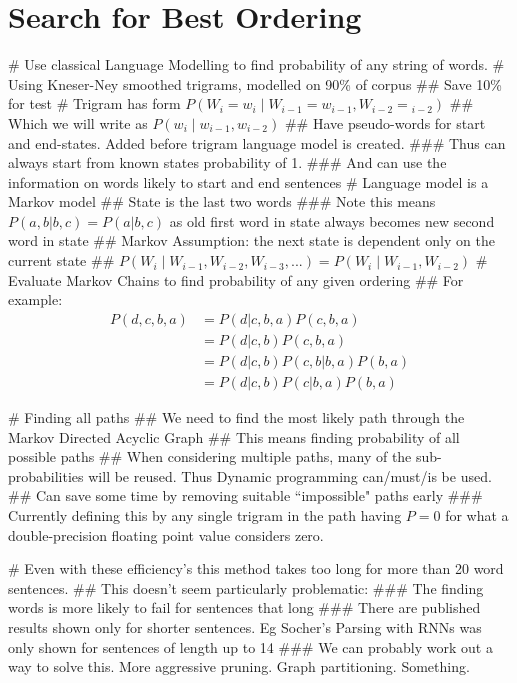 \documentclass[]{scrartcl}
\numberwithin{equation}{section}
\numberwithin{figure}{section}
\theoremstyle{plain}
\theoremstyle{definition}
\begin{document}
\section{Search for Best Ordering}
\begin{easylist}[itemize]
	# Use classical Language Modelling to find probability of any string of words.
	# Using Kneser-Ney smoothed trigrams, modelled on 90\% of corpus
	## Save 10\% for test
	# Trigram has form $P(W_i\!=\!w_i \mid W_{i-1}\!=\!w_{i-1}, W_{i-2}\!=\!_{i-2})$
	## Which we will write as $P(w_i \mid w_{i-1}, w_{i-2})$
	## Have pseudo-words for start and end-states. Added before trigram language model is created.
	### Thus can always start from known states probability of 1.
	### And can use the information on words likely to start and end sentences
	# Language model is a Markov model
	## State is the last two words
	### Note this means $P(a,b|b,c)=P(a|b,c)$ as old first word in state always becomes new second word in state
	## Markov Assumption: the next state is dependent only on the current state
	##  $P(W_i \mid W_{i-1}, W_{i-2}, W_{i-3}, ...) = P(W_i \mid W_{i-1}, W_{i-2})$
	# Evaluate Markov Chains to find probability of any given ordering
	## For example:
	\begin{equation}
	\begin{split}
	P(d,c,b,a) &= P(d|c,b,a) P(c,b,a) \\
			   &= P(d|c,b) P(c,b,a) \\
			   &= P(d|c,b) P(c,b|b,a) P(b,a) \\
			   &=P(d|c,b) P(c|b,a) P(b,a)
	\end{split}
	\end{equation}
	
	# Finding all paths
	## We need to find the most likely path through the Markov Directed Acyclic Graph
	## This means finding probability of all possible paths
	## When considering multiple paths, many of the sub-probabilities will be reused. Thus Dynamic programming can/must/is be used.
	## Can save some time by removing suitable ``impossible" paths early
	### Currently defining this by any single trigram in the path having $P=0$ for what a double-precision floating point value considers zero.
	
	# Even with these efficiency's this method takes too long for more than 20 word sentences. 
	## This doesn't seem particularly problematic:
	### The finding words is more likely to fail for sentences that long
	### There are published results shown only for shorter sentences. Eg Socher's Parsing with RNNs was only shown for sentences of length up to 14
	### We can probably work out a way to solve this. More aggressive pruning. Graph partitioning. Something.

	
\end{easylist}
\end{document}
